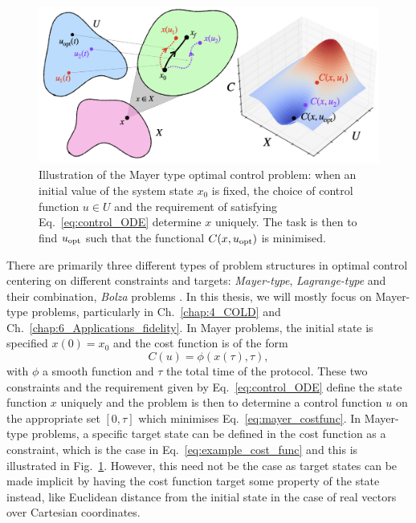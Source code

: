 \begin{figure}[t]
\centering
\includegraphics[width=0.9\linewidth]{images_v1/optimal_control_illustration.png} \caption[Illustration of optimal control problem structure]{Illustration of the Mayer type optimal control problem: when an initial value of the system state $x_0$ is fixed, the choice of control function $u \in U$ and the requirement of satisfying Eq.~\eqref{eq:control_ODE} determine $x$ uniquely. The task is then to find $u_{\rm opt}$ such that the functional $C(x, u_{\rm opt})$ is minimised.}\label{fig:optimal_control}
\end{figure}

There are primarily three different types of problem structures in optimal control centering on different constraints and targets: \emph{Mayer-type}, \emph{Lagrange-type} and their combination, \emph{Bolza} problems \cite{dalessandro_introduction_2021}. In this thesis, we will mostly focus on Mayer-type problems, particularly in Ch.~\ref{chap:4_COLD} and Ch.~\ref{chap:6_Applications_fidelity}. In Mayer problems, the initial state is specified $x(0) = x_0$ and the cost function is of the form
\begin{equation}\label{eq:mayer_costfunc}
    C(u) = \phi(x(\tau), \tau),
\end{equation}
with $\phi$ a smooth function and $\tau$ the total time of the protocol. These two constraints and the requirement given by Eq.~\eqref{eq:control_ODE} define the state function $x$ uniquely and the problem is then to determine a control function $u$ on the appropriate set $[0, \tau]$ which minimises Eq.~\eqref{eq:mayer_costfunc}. In Mayer-type problems, a specific target state can be defined in the cost function as a constraint, which is the case in Eq.~\eqref{eq:example_cost_func} and this is illustrated in Fig.~\ref{fig:optimal_control}. However, this need not be the case as target states can be made implicit by having the cost function target some property of the state instead, like Euclidean distance from the initial state in the case of real vectors over Cartesian coordinates. 

